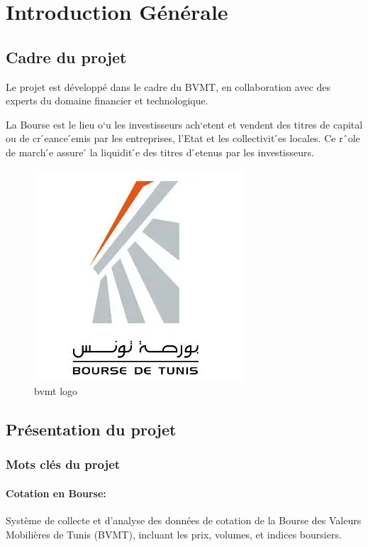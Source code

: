 \section{Introduction Générale}

\subsection{Cadre du projet}
Le projet est développé dans le cadre du BVMT, en collaboration avec des experts du domaine financier et technologique.


La Bourse est le lieu o`u les investisseurs ach`etent et vendent des titres de capital ou de
cr ́eance  ́emis par les entreprises, l’Etat et les collectivit ́es locales. Ce rˆole de march ́e assure  ́
la liquidit ́e des titres d ́etenus par les investisseurs.

\begin{figure}[H]
    \centering
    \includegraphics[width=\figwidth]{img/bvmt logo.png}
    \caption{bvmt logo}
    \label{fig:bvmt logo}
\end{figure}

\subsection{Présentation du projet}
\subsubsection{Mots clés du projet}
\paragraph{Cotation en Bourse:}

Système de collecte et d'analyse des données de cotation de la Bourse des Valeurs Mobilières de Tunis (BVMT), incluant les prix, volumes, et indices boursiers.


